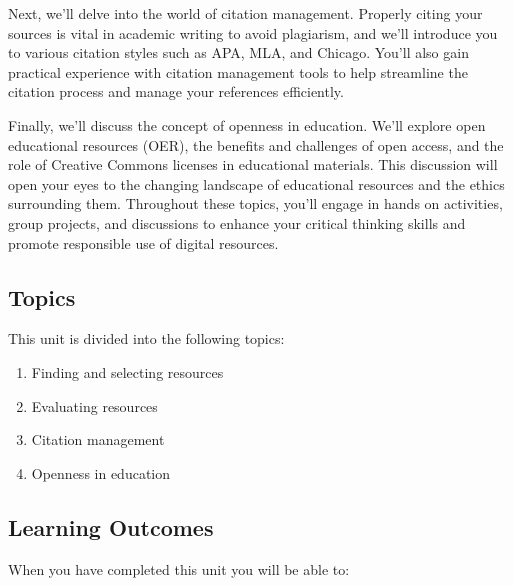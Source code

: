 \documentclass[
  letterpaper,
  DIV=11,
  numbers=noendperiod]{scrreprt}
\providecommand{\tightlist}{%
  \setlength{\itemsep}{0pt}\setlength{\parskip}{0pt}}\usepackage{longtable,booktabs,array}
\begin{document}
Next, we'll delve into the world of citation management. Properly citing
your sources is vital in academic writing to avoid plagiarism, and we'll
introduce you to various citation styles such as APA, MLA, and Chicago.
You'll also gain practical experience with citation management tools to
help streamline the citation process and manage your references
efficiently.

Finally, we'll discuss the concept of openness in education. We'll
explore open educational resources (OER), the benefits and challenges of
open access, and the role of Creative Commons licenses in educational
materials. This discussion will open your eyes to the changing landscape
of educational resources and the ethics surrounding them. Throughout
these topics, you'll engage in hands on activities, group projects, and
discussions to enhance your critical thinking skills and promote
responsible use of digital resources.

\subsection*{Topics}\label{topics-1}

This unit is divided into the following topics:

\begin{enumerate}
\def\labelenumi{\arabic{enumi}.}
\tightlist
\item
  Finding and selecting resources
\item
  Evaluating resources
\item
  Citation management
\item
  Openness in education
\end{enumerate}

\subsection*{Learning Outcomes}\label{learning-outcomes}

When you have completed this unit you will be able to:
\end{document}
